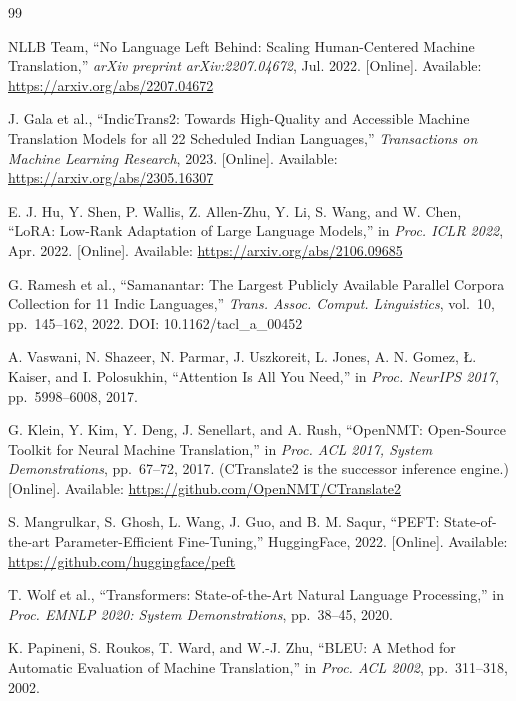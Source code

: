 \documentclass[journal]{IEEEtran}
\begin{document}

\begin{thebibliography}{99}

NLLB Team, ``No Language Left Behind: Scaling Human-Centered Machine Translation,''
\textit{arXiv preprint arXiv:2207.04672}, Jul. 2022.
[Online]. Available: \url{https://arxiv.org/abs/2207.04672}

J. Gala et al., ``IndicTrans2: Towards High-Quality and Accessible Machine Translation
Models for all 22 Scheduled Indian Languages,''
\textit{Transactions on Machine Learning Research}, 2023.
[Online]. Available: \url{https://arxiv.org/abs/2305.16307}

E. J. Hu, Y. Shen, P. Wallis, Z. Allen-Zhu, Y. Li, S. Wang, and W. Chen,
``LoRA: Low-Rank Adaptation of Large Language Models,''
in \textit{Proc. ICLR 2022}, Apr. 2022.
[Online]. Available: \url{https://arxiv.org/abs/2106.09685}

G. Ramesh et al., ``Samanantar: The Largest Publicly Available Parallel Corpora
Collection for 11 Indic Languages,''
\textit{Trans. Assoc. Comput. Linguistics}, vol.~10, pp.~145--162, 2022.
DOI: 10.1162/tacl\_a\_00452

A. Vaswani, N. Shazeer, N. Parmar, J. Uszkoreit, L. Jones, A. N. Gomez,
\L. Kaiser, and I. Polosukhin, ``Attention Is All You Need,''
in \textit{Proc. NeurIPS 2017}, pp.~5998--6008, 2017.

G. Klein, Y. Kim, Y. Deng, J. Senellart, and A. Rush,
``OpenNMT: Open-Source Toolkit for Neural Machine Translation,''
in \textit{Proc. ACL 2017, System Demonstrations}, pp.~67--72, 2017.
(CTranslate2 is the successor inference engine.)
[Online]. Available: \url{https://github.com/OpenNMT/CTranslate2}

S. Mangrulkar, S. Ghosh, L. Wang, J. Guo, and B. M. Saqur,
``PEFT: State-of-the-art Parameter-Efficient Fine-Tuning,''
HuggingFace, 2022.
[Online]. Available: \url{https://github.com/huggingface/peft}

T. Wolf et al., ``Transformers: State-of-the-Art Natural Language Processing,''
in \textit{Proc. EMNLP 2020: System Demonstrations}, pp.~38--45, 2020.

K. Papineni, S. Roukos, T. Ward, and W.-J. Zhu,
``BLEU: A Method for Automatic Evaluation of Machine Translation,''
in \textit{Proc. ACL 2002}, pp.~311--318, 2002.


\end{thebibliography}
\end{document}
